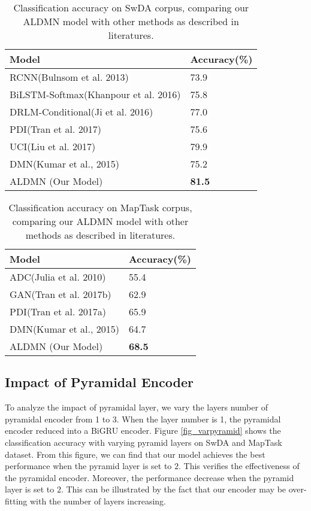 \documentclass[conference]{IEEEtran}
\begin{document}
\begin{table}[!t]
		\centering
		\begin{tabular}{p{5.4cm}p{1.2cm}}
			\hline
			Model &Accuracy(\%)\\
			\hline
			RCNN(Bulnsom et al. 2013)&73.9\\
			BiLSTM-Softmax(Khanpour et al. 2016)&75.8\\
			DRLM-Conditional(Ji et al. 2016)&77.0\\
			PDI(Tran et al. 2017)&75.6 \\
			UCI(Liu et al. 2017)&79.9\\
			DMN(Kumar et al., 2015) & 75.2\\
			\hline
			ALDMN (Our Model) & \textbf{81.5} \\
			\hline
		\end{tabular}
		\caption{Classification accuracy on SwDA corpus, comparing our ALDMN model with other methods as described in literatures.}
		\label{table:result_1}
	\end{table}
	
	\begin{table}[!t]
		\centering
		\begin{tabular}{p{5.4cm}p{1.2cm}}\hline
			Model &Accuracy(\%)\\
			\hline
			ADC(Julia et al. 2010)&55.4\\
			GAN(Tran et al. 2017b)&62.9 \\
			PDI(Tran et al. 2017a)&65.9\\
			DMN(Kumar et al., 2015)&64.7\\
			\hline
			ALDMN (Our Model) & \textbf{68.5} \\
			\hline
		\end{tabular}
		\caption{Classification accuracy on MapTask corpus, comparing our ALDMN model with other methods as described in literatures.}	
		\label{table:result_2}
	\end{table}
	
	
\subsection{Impact of Pyramidal Encoder}
	To analyze the impact of pyramidal layer, we vary the layers number of pyramidal encoder from 1 to 3. When the layer number is 1, the pyramidal encoder reduced into a BiGRU encoder. Figure \ref{fig_varpyramid} shows the classification accuracy with varying pyramid layers on SwDA and MapTask dataset. 
	From this figure, we can find that our model achieves the best performance when the pyramid layer is set to $2$. This verifies the effectiveness of the pyramidal encoder. Moreover, the performance decrease when the pyramid layer is set to $2$. This can be illustrated by the fact that our encoder may be over-fitting with the number of layers increasing.
	
\end{document}
